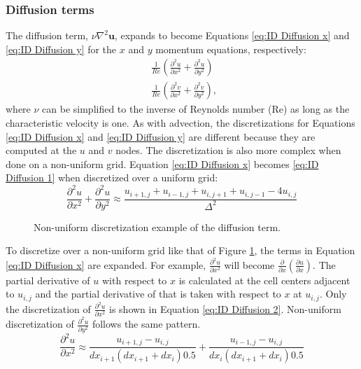 \subsubsection{Diffusion terms}
\label{sec:NS ID Diffusion}
The diffusion term, $\nu \nabla^2 \textbf{u}$, expands to become Equations \eqref{eq:ID Diffusion x} and \eqref{eq:ID Diffusion y} for the $x$ and $y$ momentum equations, respectively:
\begin{align}
& \frac{1}{Re}\left(\frac{\partial^2 u}{\partial x^2} + \frac{\partial^2 u}{\partial y^2}\right)\label{eq:ID Diffusion x} \\
& \frac{1}{Re}\left(\frac{\partial^2 v}{\partial x^2} + \frac{\partial^2 v}{\partial y^2}\right),\; \label{eq:ID Diffusion y}
\end{align}
where $\nu$ can be simplified to the inverse of Reynolds number (Re) as long as the characteristic velocity is one. 
As with advection, the discretizations for Equations \eqref{eq:ID Diffusion x} and \eqref{eq:ID Diffusion y} are different because they are computed at the $u$ and $v$ nodes. 
The discretization is also more complex when done on a non-uniform grid.
Equation \eqref{eq:ID Diffusion x} becomes \eqref{eq:ID Diffusion 1} when discretized over a uniform grid: 
\begin{equation}
\frac{\partial^2 u}{\partial x^2} + \frac{\partial^2 u}{\partial y^2}\approx\frac{u_{i+1,j} + u_{i-1,j} + u_{i,j+1} + u_{i,j-1} - 4u_{i,j}}{\Delta^2}\label{eq:ID Diffusion 1}
\end{equation}
\begin{figure}[!htb]
	\centering
	
	\caption{Non-uniform discretization example of the diffusion term.}
	\label{fig:ID diffusion}
\end{figure}
To discretize over a non-uniform grid like that of Figure \ref{fig:ID diffusion}, the terms in Equation \eqref{eq:ID Diffusion x} are expanded. 
For example, $\frac{\partial^2 u}{\partial x^2}$ will become $\frac{\partial}{\partial x}\left(\frac{\partial u}{\partial x}\right)$. 
The partial derivative of $u$ with respect to $x$ is calculated at the cell centers adjacent to $u_{i,j}$ and the partial derivative of that is taken with respect to $x$ at $u_{i,j}.$
Only the discretization of $\frac{\partial^2 u}{\partial x^2}$ is shown in Equation \eqref{eq:ID Diffusion 2}. 
Non-uniform discretization of $\frac{\partial^2 u}{\partial y^2}$ follows the same pattern. 
\begin{equation}
\frac{\partial^2 u}{\partial x^2}\approx\frac{u_{i+1,j} - u_{i,j}}{dx_{i+1}(dx_{i+1}+dx_i)0.5} + \frac{u_{i-1,j} - u_{i,j}}{dx_{i}(dx_{i+1}+dx_i)0.5}  \label{eq:ID Diffusion 2}
\end{equation}
